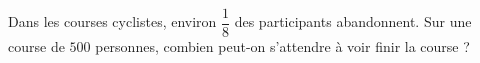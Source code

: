 
\begin{exercice}\label{exo2smath-0029}

    Dans les courses cyclistes, environ \( \dfrac{ 1 }{ 8 }\) des participants abandonnent. Sur une course de \( 500\) personnes, combien peut-on s'attendre à voir finir la course ?

\end{exercice}
